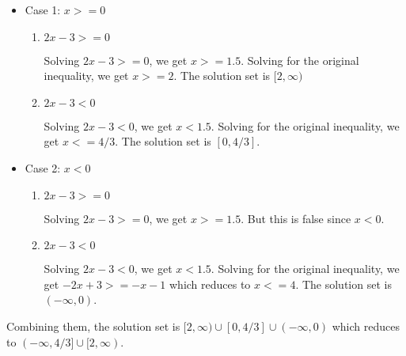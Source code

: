 \documentclass{article}
\begin{document}
\begin{itemize}
\item Case 1: $x >= 0$

  \begin{enumerate}
  \item $2x - 3 >= 0$

    Solving $2x - 3 >= 0$, we get $x >= 1.5$. Solving for the original
    inequality, we get $ x >= 2$. The solution set is $[2, \infty)$
    
  \item $2x - 3 < 0$

    Solving $2x - 3 < 0$, we get $x < 1.5$. Solving for the original
    inequality, we get $x <= 4/3$. The solution set is $[0, 4/3]$.
  \end{enumerate}

\item Case 2: $x < 0$

  \begin{enumerate}
  \item $2x - 3 >= 0$

    Solving $2x - 3 >= 0$, we get $x >= 1.5$. But this is false since
    $x < 0$.
    
  \item $2x - 3 < 0$

    Solving $2x - 3 < 0$, we get $x < 1.5$. Solving for the original
    inequality, we get $-2x + 3 >= -x - 1$ which reduces to $x <= 4$.
    The solution set is $(-\infty, 0)$.
  \end{enumerate}

\end{itemize}

Combining them, the solution set is
$[2, \infty) \cup [0, 4/3] \cup (-\infty, 0)$ which reduces to
$(-\infty, 4/3] \cup [2, \infty)$.
\end{document}
